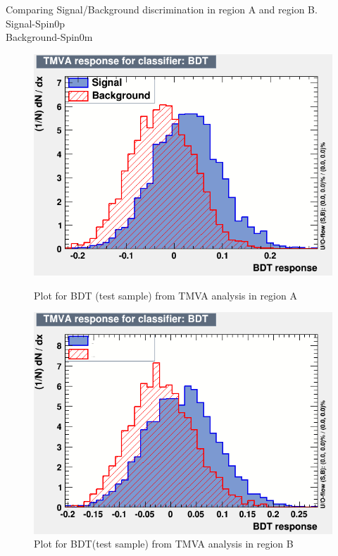 \documentclass[english]{article}
\begin{document}
Comparing Signal/Background discrimination in region A and region B.\\
Signal-Spin0p\\
Background-Spin0m
\begin{figure}[!htb]
	\includegraphics[width=\linewidth]{BDT_t_A}
	\caption{Plot for BDT (test sample) from TMVA analysis in region A}
\endminipage\hfill
{}
	\includegraphics[width=\linewidth]{BDT_t_B}
	\caption{Plot for BDT(test sample) from TMVA analysis in region B} 
\endminipage\hfill
\end{figure}
\end{document}
